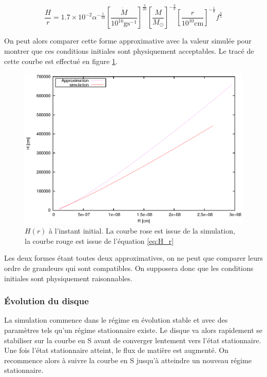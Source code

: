 \begin{equation}
  \label{eq:H_r}
	\frac{H}{r} = 1.7 \times 10^{-2}\alpha^{- \frac{1}{10}} \left[ \frac{\dot{M}}{10^{16} \mbox{g} \mbox{s}^{-1}} \right]^{\frac{3}{20}} \left[ \frac{M}{M_\odot}\right]^{- \frac{3}{8}} \left[ \frac{r}{10^{10} \mathrm{cm}}\right]^{- \frac{1}{8}} f^{\frac{3}{5}}
\end{equation}
 
On peut alors comparer cette forme approximative avec la valeur simulée pour montrer que ces 
conditions initiales sont physiquement acceptables. Le tracé de cette courbe est effectué en figure \ref{fig:H_r}.

\begin{figure}
  \begin{center}
    \includegraphics[]{ic_h.eps}
  \end{center}
  \caption{$H(r)$ à l'instant initial. La courbe rose est issue de la simulation, la courbe rouge est issue de l'équation \eqref{eq:H_r}}
  \label{fig:H_r}
\end{figure} 

Les deux formes étant toutes deux approximatives, on ne peut que comparer leurs ordre de grandeurs qui sont compatibles. On supposera donc que les conditions initiales sont physiquement raisonnables.

\subsubsection{Évolution du disque}

La simulation commence dans le régime en évolution stable et avec des paramètres tels qu'un régime stationnaire existe. Le disque va alors rapidement se stabiliser sur la courbe en S avant de converger lentement vers l'état stationnaire. Une fois l'état stationnaire atteint, le flux de matière est augmenté. On recommence alors à suivre la courbe en S jusqu'à atteindre un nouveau régime stationnaire.


